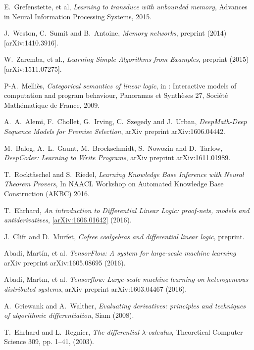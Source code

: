 \documentclass[english,letter paper,12pt,leqno]{article}
\theoremstyle{example}
\numberwithin{equation}{section}
\begin{document}
\begin{thebibliography}{BHLS03}
E.~Grefenstette, et al, \textsl{Learning to transduce with unbounded memory}, Advances in Neural Information Processing Systems, 2015.

J.~Weston, C.~Sumit and B.~Antoine, \textsl{Memory networks}, preprint (2014) [arXiv:1410.3916].

W.~Zaremba, et al., \textsl{Learning Simple Algorithms from Examples}, preprint (2015) [arXiv:1511.07275].

P-A.~Melli\`{e}s, \textsl{Categorical semantics of linear logic}, in : Interactive models of computation and program behaviour, Panoramas et Synth\`{e}ses $27$, Soci\'{e}t\'{e} Math\'{e}matique de France, 2009.

A.~A.~Alemi, F.~Chollet, G.~Irving, C.~Szegedy and J.~Urban, \textsl{DeepMath-Deep Sequence Models for Premise Selection}, arXiv preprint arXiv:1606.04442.

M.~Balog, A.~L.~Gaunt, M.~Brockschmidt, S.~Nowozin and D.~Tarlow, \textsl{DeepCoder: Learning to Write Programs}, arXiv preprint arXiv:1611.01989.

T.~Rockt\"aschel and S.~Riedel, \textsl{Learning Knowledge Base Inference with Neural Theorem Provers}, In NAACL Workshop on Automated Knowledge Base Construction (AKBC) 2016.

T.~Ehrhard, \textsl{An introduction to Differential Linear Logic: proof-nets, models and antiderivatives}, \href{https://arxiv.org/abs/1606.01642}{[arXiv:1606.01642]} (2016).

J.~Clift and D.~Murfet, \textsl{Cofree coalgebras and differential linear logic}, preprint.

Abadi, Martín, et al. \textsl{TensorFlow: A system for large-scale machine learning} arXiv preprint arXiv:1605.08695 (2016).

Abadi, Martın, et al. \textsl{Tensorflow: Large-scale machine learning on heterogeneous distributed systems}, arXiv preprint arXiv:1603.04467 (2016).

A.~Griewank and A.~Walther, \textsl{Evaluating derivatives: principles and techniques of algorithmic differentiation}, Siam (2008).

T.~Ehrhard and L.~Regnier, \textsl{The differential $\lambda$-calculus}, Theoretical Computer Science 309, pp. 1--41, (2003).


\end{thebibliography}
\end{document}
